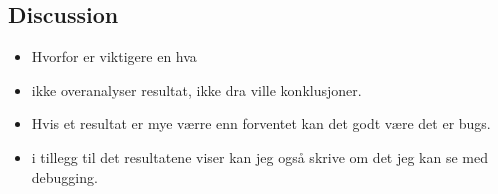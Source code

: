 

\subsection{Discussion}
\begin{itemize}
    \item Hvorfor er viktigere en hva
    \item ikke overanalyser resultat, ikke dra ville konklusjoner.
    \item Hvis et resultat er mye værre enn forventet kan det godt være det er bugs.
    \item i tillegg til det resultatene viser kan jeg også skrive om det jeg kan se med debugging.
\end{itemize}

